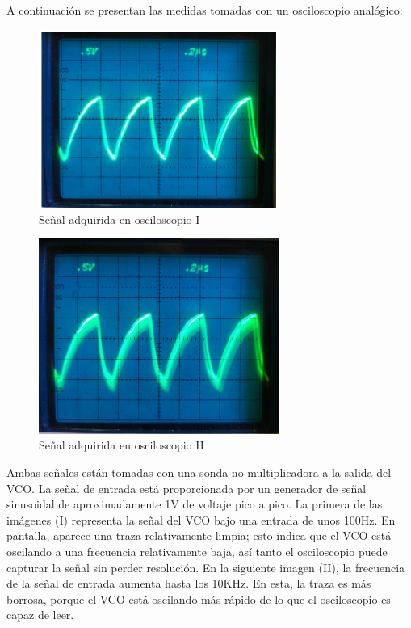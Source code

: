 \documentclass[12pt]{report} %
\begin{document}
	A continuación se presentan las medidas tomadas con un osciloscopio analógico:
	
	\begin{figure}[H]
		\includegraphics[width=0.7\textwidth]{proto-osc-clear-cropped.png}
		\caption[Señal adquirida en osciloscopio I]{Señal adquirida en osciloscopio I}
		\label{fig:proto-osc-clear-cropped.png}
	\end{figure}
	
	\begin{figure}[H]
		\includegraphics[width=0.7\textwidth]{proto-osc-blurry-cropped.png}
		\caption[Señal adquirida en osciloscopio II]{Señal adquirida en osciloscopio II}
		\label{fig:proto-osc-blurry-png.png}
	\end{figure}

	Ambas señales están tomadas con una sonda no multiplicadora a la salida del VCO. La señal de entrada está proporcionada por un generador de señal sinusoidal de aproximadamente 1V de voltaje pico a pico. La primera de las imágenes (I) representa la señal del VCO bajo una entrada de unos 100Hz. En pantalla, aparece una traza relativamente limpia; esto indica que el VCO está oscilando a una frecuencia relativamente baja, así tanto el osciloscopio puede capturar la señal sin perder resolución. En la siguiente imagen (II), la frecuencia de la señal de entrada aumenta hasta los 10KHz. En esta, la traza es más borrosa, porque el VCO está oscilando más rápido de lo que el osciloscopio es capaz de leer.
	
\end{document}
